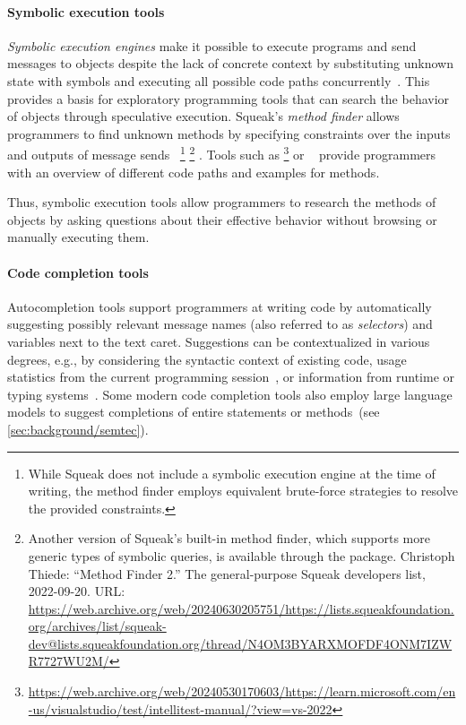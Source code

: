 	\paragraph{Symbolic execution tools}
	\label{par:background/expsys/tools/symbex}
	\emph{Symbolic execution engines} make it possible to execute programs and send messages to objects despite the lack of concrete context by substituting unknown state with symbols and executing all possible code paths concurrently~\cite{cadar2013symbolic,thiede2023symbolic}.
	This provides a basis for exploratory programming tools that can search the behavior of objects through speculative execution.
	Squeak's \emph{method finder} allows programmers to find unknown methods by specifying constraints over the inputs and outputs of message sends~\cite[sec.~1.8]{thiede2023squeak}%
	\footnote{While Squeak does not include a symbolic execution engine at the time of writing, the method finder employs equivalent brute-force strategies to resolve the provided constraints.}%
	\footnote{
		Another version of Squeak's built-in method finder, which supports more generic types of symbolic queries, is available through the  package.
		Christoph Thiede: ``Method Finder 2.'' The general-purpose Squeak developers list, 2022-09-20. URL:
		\url{https://web.archive.org/web/20240630205751/https://lists.squeakfoundation.org/archives/list/squeak-dev@lists.squeakfoundation.org/thread/N4OM3BYARXMOFDF4ONM7IZWR7727WU2M/}
	}%
	.
	Tools such as \footnote{
		\url{https://web.archive.org/web/20240530170603/https://learn.microsoft.com/en-us/visualstudio/test/intellitest-manual/?view=vs-2022}
	} or ~\cite{hentschel2019symbolic} provide programmers with an overview of different code paths and examples for methods.

	Thus, symbolic execution tools allow programmers to research the methods of objects by asking questions about their effective behavior without browsing or manually executing them.

	\paragraph{Code completion tools}
	\label{par:background/expsys/tools/completion}
	Autocompletion tools support programmers at writing code by automatically suggesting possibly relevant message names (also referred to as \emph{selectors}) and variables next to the text caret.
	Suggestions can be contextualized in various degrees, e.g., by considering the syntactic context of existing code, usage statistics from the current programming session~\cite{robbes2008program}, or information from runtime or typing systems~\cite{pluquet2009fast}.
	Some modern code completion tools also employ large language models to suggest completions of entire statements or methods~(see \cref{sec:background/semtec}).

